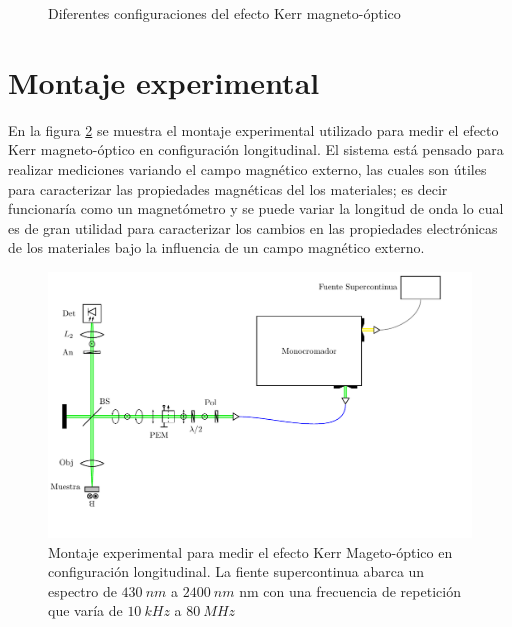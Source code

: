 \documentclass[paper=letter, fontsize=12pt]{scrartcl}
\numberwithin{equation}{section}		%
\numberwithin{figure}{section}			%
\numberwithin{table}{section}				%
\begin{document}
	\begin{figure}[!hbt]
		\centering
		\caption[Configuraciones de Efecto Kerr magneto-\'optico.]{Diferentes configuraciones del efecto Kerr magneto-\'optico}
		\label{Kerr:fig:Conf}
	\end{figure}

\section{Montaje experimental}
En la figura \ref{Met:fig:kerr} se muestra el montaje experimental utilizado para medir el efecto Kerr magneto-\'optico en configuraci\'on longitudinal. El sistema est\'a pensado para realizar mediciones variando el campo magn\'etico externo, las cuales son \'utiles para caracterizar las propiedades magn\'eticas del los materiales; es decir funcionar\'ia como un magnet\'ometro y se puede variar la longitud de onda lo cual es de gran utilidad para caracterizar los cambios en las propiedades electr\'onicas de los materiales bajo la influencia de un campo magn\'etico externo.
\begin{figure}[!hbt]
	\centering
	\includegraphics[scale=0.6]{figMet/diagrama/diagrama.pdf}
	\caption[Montaje experimental de espectroscop\'ia de efecto kerr magneto-\'optico.]{Montaje experimental para medir el efecto Kerr Mageto-\'optico en configuraci\'on longitudinal. La fiente supercontinua abarca un espectro de $430~nm $ a $2400~nm$ nm con una frecuencia de repetici\'on que var\'ia de $10~kHz $ a $80~MHz$ }
	\label{Met:fig:kerr}
\end{figure}
\end{document}
